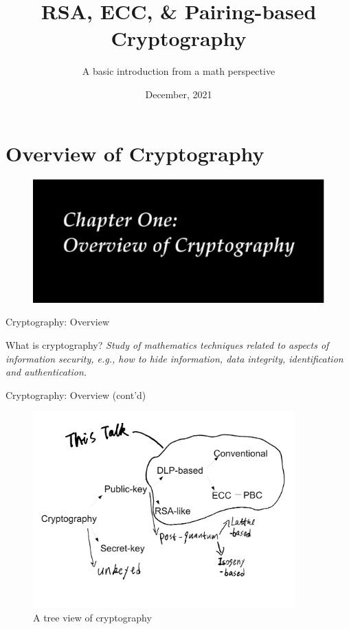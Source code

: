 \documentclass{beamer}
\title{RSA, ECC, \& Pairing-based Cryptography}
\subtitle{A basic introduction from a math perspective}
\author
{ 
Ning Shang 
}
\institute{For filling the void in the cryptoclub}
\date{December, 2021}
\begin{document}
\begin{frame}
\titlepage
\end{frame}



\section{Overview of Cryptography}
\begin{frame}{}
\begin{figure}[htbp]
\centering
  \includegraphics[width=\textwidth]{img/chap1-overview-crypto.pdf}
\end{figure}
\end{frame}

\begin{frame}{Cryptography: Overview}
    \begin{block}{What is cryptography?}
    \emph{Study of mathematics techniques related to aspects of information
security, e.g., how to hide information, data integrity, identification and
authentication.}
    \end{block}
\end{frame}

\begin{frame}{Cryptography: Overview (cont'd)}
\begin{figure}[htbp]
\centering
  \includegraphics[width=0.9\textwidth]{img/cryptotree.pdf}
  \caption{A tree view of cryptography}
  \label{fig:cryptotree}
\end{figure}

\end{frame}
\end{document}
